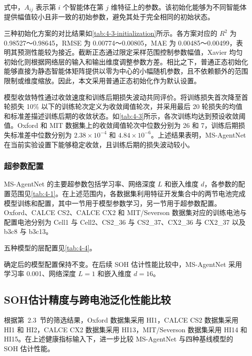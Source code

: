 式中，$A_{ij}$ 表示第 $i$ 个智能体在第 $j$ 维特征上的参数。该初始化能够为不同智能体提供幅值较小且非一致的初始参数，避免其处于完全相同的初始状态。

三种初始化方案的对比结果如\cref{tab:4-3-initialization}所示。各方案对应的 $R^2$ 为 0.98527～0.98645，RMSE 为 0.00774～0.00805，MAE 为 0.00485～0.00499，表明其预测性能较为接近。截断正态通过限定采样范围控制参数幅值，Xavier 均匀初始化则根据网络层的输入和输出维度调整参数方差。相比之下，普通正态初始化能够直接为静态智能体矩阵提供以零为中心的小幅随机参数，且不依赖额外的范围限制或维度缩放。因此，本文采用普通正态初始化作为默认设置。

模型收敛特性通过收敛速度和训练后期损失波动共同评价。将训练损失首次降至首轮损失 10\% 以下的训练轮次定义为收敛阈值轮次，并采用最后 20 轮损失的均值和标准差描述训练后期的收敛状态。如\cref{tab:4-3}所示，各次训练均达到预设收敛阈值。Oxford 和 MIT 数据集上的收敛阈值轮次中位数分别为 26 和 7，训练后期损失标准差中位数分别为 $2.38\times10^{-4}$ 和 $4.84\times10^{-6}$。上述结果表明，MS-AgentNet 在当前实验设置下能够稳定收敛，且训练后期的损失波动较小。



\FloatBarrier

\subsubsection{超参数配置}

MS-AgentNet 的主要超参数包括学习率、网络深度 $L$ 和嵌入维度 $d$，各参数的配置范围见\cref{tab:4-1}。在上述范围内，各数据集利用特征开发集合中的两节电池完成模型训练和配置，其中一节用于模型参数学习，另一节用于超参数配置。Oxford、CALCE CS2、CALCE CX2 和 MIT/Severson 数据集对应的训练电池与配置电池分别为 Cell1 与 Cell2、CS2\_36 与 CS2\_37、CX2\_36 与 CX2\_37 以及 b3c8 与 b3c13。

五种模型的层配置见\cref{tab:4-4}。



确定后的模型配置保持不变。在后续 SOH 估计性能比较中，MS-AgentNet 采用学习率 0.001、网络深度 $L=1$ 和嵌入维度 $d=16$。



\subsection{SOH估计精度与跨电池泛化性能比较}

根据第~2.3~节的筛选结果，Oxford 数据集采用 HI1，CALCE CS2 数据集采用 HI1 和 HI2，CALCE CX2 数据集采用 HI13，MIT/Severson 数据集采用 HI14 和 HI15。在上述健康指标输入下，进一步比较 MS-AgentNet 与四种基线模型的 SOH 估计性能。


